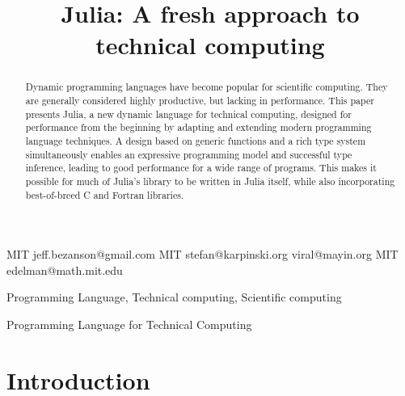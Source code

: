 \documentclass[11pt]{sigplanconf}
\begin{document}


\title{Julia: A fresh approach to technical computing}

           {MIT}
           {jeff.bezanson@gmail.com}
           {MIT}
           {stefan@karpinski.org}
           {}
           {viral@mayin.org}
           {MIT}
           {edelman@math.mit.edu}

\maketitle

\begin{abstract}
  Dynamic programming languages have become popular for scientific
  computing. They are generally considered highly productive, but
  lacking in performance. This paper presents Julia, a new dynamic
  language for technical computing, designed for performance from the
  beginning by adapting and extending modern programming language
  techniques. A design based on generic functions and a rich type
  system simultaneously enables an expressive programming model and
  successful type inference, leading to good performance for a wide
  range of programs. This makes it possible for much of Julia's
  library to be written in Julia itself, while also incorporating
  best-of-breed C and Fortran libraries.
\end{abstract}


\terms
Programming Language, Technical computing, Scientific computing

\keywords
Programming Language for Technical Computing

\section{Introduction}
\end{document}

